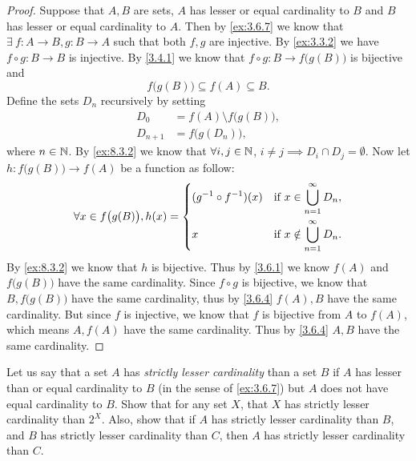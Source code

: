 \begin{proof}
  Suppose that \(A, B\) are sets, \(A\) has lesser or equal cardinality to \(B\) and \(B\) has lesser or equal cardinality to \(A\).
  Then by \cref{ex:3.6.7} we know that \(\exists\ f : A \to B, g : B \to A\) such that both \(f, g\) are injective.
  By \cref{ex:3.3.2} we have \(f \circ g : B \to B\) is injective.
  By \cref{3.4.1} we know that \(f \circ g : B \to f\big(g(B)\big)\) is bijective and
  \[
    f\big(g(B)\big) \subseteq f(A) \subseteq B.
  \]
  Define the sets \(D_n\) recursively by setting
  \begin{align*}
    D_0       & = f(A) \setminus f\big(g(B)\big), \\
    D_{n + 1} & = f\big(g(D_n)\big),
  \end{align*}
  where \(n \in \mathbb{N}\).
  By \cref{ex:8.3.2} we know that \(\forall i, j \in \mathbb{N}\), \(i \neq j \implies D_i \cap D_j = \emptyset\).
  Now let \(h : f\big(g(B)\big) \to f(A)\) be a function as follow:
  \[
    \forall x \in f\big(g(B)\big), h(x) = \begin{dcases}
      (g^{-1} \circ f^{-1})(x) & \text{if } x \in \bigcup_{n = 1}^\infty D_n,    \\
      x                        & \text{if } x \notin \bigcup_{n = 1}^\infty D_n.
    \end{dcases}
  \]
  By \cref{ex:8.3.2} we know that \(h\) is bijective.
  Thus by \cref{3.6.1} we know \(f(A)\) and \(f\big(g(B)\big)\) have the same cardinality.
  Since \(f \circ g\) is bijective, we know that \(B, f\big(g(B)\big)\) have the same cardinality, thus by \cref{3.6.4} \(f(A), B\) have the same cardinality.
  But since \(f\) is injective, we know that \(f\) is bijective from \(A\) to \(f(A)\), which means \(A, f(A)\) have the same cardinality.
  Thus by \cref{3.6.4} \(A, B\) have the same cardinality.
\end{proof}

\begin{ex}\label{ex:8.3.4}
  Let us say that a set \(A\) has \emph{strictly lesser cardinality} than a set \(B\) if \(A\) has lesser than or equal cardinality to \(B\) (in the sense of \cref{ex:3.6.7}) but \(A\) does not have equal cardinality to \(B\).
  Show that for any set \(X\), that \(X\) has strictly lesser cardinality than \(2^X\).
  Also, show that if \(A\) has strictly lesser cardinality than \(B\), and \(B\) has strictly lesser cardinality than \(C\), then \(A\) has strictly lesser cardinality than \(C\).
\end{ex}

